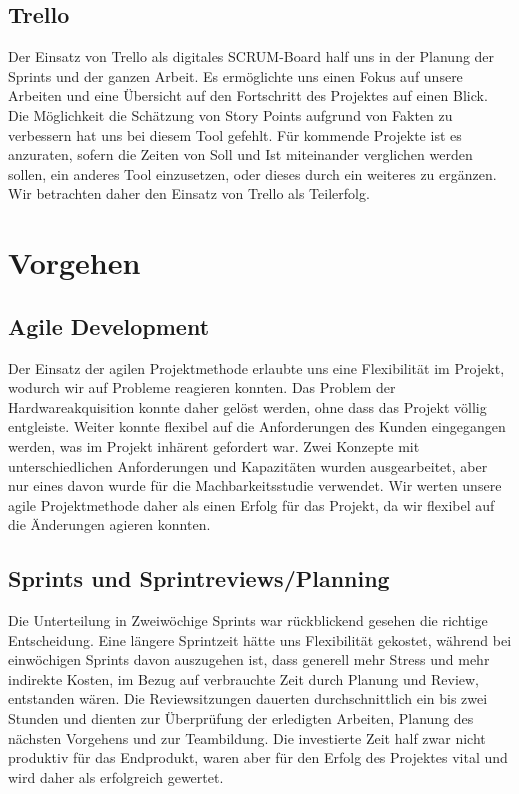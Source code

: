 \subsection{Trello}
Der Einsatz von Trello als digitales SCRUM-Board half uns in der Planung der Sprints und der ganzen Arbeit. Es ermöglichte uns einen Fokus auf unsere Arbeiten und eine Übersicht auf den Fortschritt des Projektes auf einen Blick. Die Möglichkeit die Schätzung von Story Points aufgrund von Fakten zu verbessern hat uns bei diesem Tool gefehlt. Für kommende Projekte ist es anzuraten, sofern die Zeiten von Soll und Ist miteinander verglichen werden sollen, ein anderes Tool einzusetzen, oder dieses durch ein weiteres zu ergänzen. Wir betrachten daher den Einsatz von Trello als Teilerfolg.

\section{Vorgehen}
\subsection{Agile Development}
Der Einsatz der agilen Projektmethode erlaubte uns eine Flexibilität im Projekt, wodurch wir auf Probleme reagieren konnten. Das Problem der Hardwareakquisition konnte daher gelöst werden, ohne dass das Projekt völlig entgleiste. Weiter konnte flexibel auf die Anforderungen des Kunden eingegangen werden, was im Projekt inhärent gefordert war. Zwei Konzepte mit unterschiedlichen Anforderungen und Kapazitäten wurden ausgearbeitet, aber nur eines davon wurde für die Machbarkeitsstudie verwendet. Wir werten unsere agile Projektmethode daher als einen Erfolg für das Projekt, da wir flexibel auf die Änderungen agieren konnten.

\subsection{Sprints und Sprintreviews/Planning}
Die Unterteilung in Zweiwöchige Sprints war rückblickend gesehen die richtige Entscheidung. Eine längere Sprintzeit hätte uns Flexibilität gekostet, während bei einwöchigen Sprints davon auszugehen ist, dass generell mehr Stress und mehr indirekte Kosten, im Bezug auf verbrauchte Zeit durch Planung und Review, entstanden wären. Die Reviewsitzungen dauerten durchschnittlich ein bis zwei Stunden und dienten zur Überprüfung der erledigten Arbeiten, Planung des nächsten Vorgehens und zur Teambildung. Die investierte Zeit half zwar nicht produktiv für das Endprodukt, waren aber für den Erfolg des Projektes vital und wird daher als erfolgreich gewertet.

